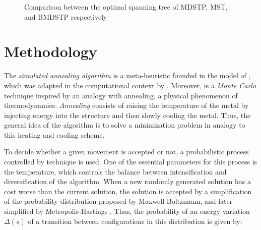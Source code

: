 \documentclass[12pt]{article}
\begin{document}
\begin{figure}[H]
\begin{center}
      \end{center}
      \caption{Comparison between the optimal spanning tree of MDSTP, MST, and BMDSTP respectively}
      \label{fig:compst}
    \end{figure}





\section{Methodology}


The \emph{simulated annealing algorithm} is a meta-heuristic founded in the model of \cite{Metropolis1953}, which was adapted in the computational context by \cite{Kirkpatrick1983, Cern1985}. Moreover, is a \emph{Monte Carlo} technique inspired by an analogy with annealing, a physical phenomenon of thermodynamics. \emph{Annealing} consists of raising the temperature of the metal by injecting energy into the structure and then slowly cooling the metal. Thus, the general idea of the algorithm is to solve a minimization problem in analogy to this heating and cooling scheme. 

To decide whether a given movement is accepted or not, a probabilistic process controlled by \cite{Hastings1970} technique is used. One of the essential parameters for this process is the temperature, which controls the balance between intensification and diversification of the algorithm. When a new randomly generated solution has a cost worse than the current solution, the solution is accepted by a simplification of the probability distribution proposed by Maxwell-Boltzmann, and later simplified by Metropolis-Hastings \cite{Maxwell1860}. Thus, the probability of an energy variation $\Delta(s)$ of a transition between configurations in this distribution is given by:
\end{document}
